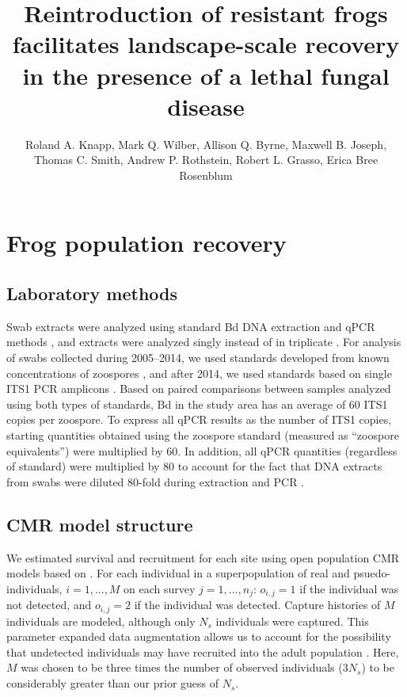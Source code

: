 \documentclass[9pt,twoside,lineno]{pnas-new-SI}
\title{Reintroduction of resistant frogs facilitates landscape-scale recovery in the presence of a lethal fungal disease}
\author{Roland A. Knapp, Mark Q. Wilber, Allison Q. Byrne, Maxwell B. Joseph, Thomas C. Smith, Andrew P. Rothstein, Robert L. Grasso, Erica Bree Rosenblum}
\begin{document}
\maketitle

\SItext
\hypertarget{frog-population-recovery-2}{%
\section{Frog population
recovery}\label{frog-population-recovery-2}}

\hypertarget{laboratory-methods}{%
\subsection{Laboratory methods}\label{laboratory-methods}}

Swab extracts were analyzed using standard Bd DNA extraction and qPCR
methods \citep{boyle2004}, and extracts were analyzed singly instead of
in triplicate \citep{kriger2006}. For analysis of swabs collected during
2005--2014, we used standards developed from known concentrations of
zoospores \citep{boyle2004}, and after 2014, we used standards based on
single ITS1 PCR amplicons \citep{longo2013}. Based on paired comparisons
between samples analyzed using both types of standards, Bd in the study
area has an average of 60 ITS1 copies per zoospore. To express all qPCR
results as the number of ITS1 copies, starting quantities obtained using
the zoospore standard (measured as ``zoospore equivalents'') were
multiplied by 60. In addition, all qPCR quantities (regardless of
standard) were multiplied by 80 to account for the fact that DNA
extracts from swabs were diluted 80-fold during extraction and PCR
\citep{vredenburg2010}.

\hypertarget{cmr-model-structure}{%
\subsection{CMR model structure}\label{cmr-model-structure}}

We estimated survival and recruitment for each site using open
population CMR models based on \citep{joseph2018}. For each individual
in a superpopulation of real and psuedo-individuals, \(i=1, ..., M\) on
each survey \(j=1, ..., n_j\): \(o_{i, j} = 1\) if the individual was
not detected, and \(o_{i, j}=2\) if the individual was detected. Capture
histories of \(M\) individuals are modeled, although only \(N_s\)
individuals were captured. This parameter expanded data augmentation
allows us to account for the possibility that undetected individuals may
have recruited into the adult population \citep{royle2012}. Here, \(M\)
was chosen to be three times the number of observed individuals
(\(3N_s\)) to be considerably greater than our prior guess of \(N_s\).
\end{document}

